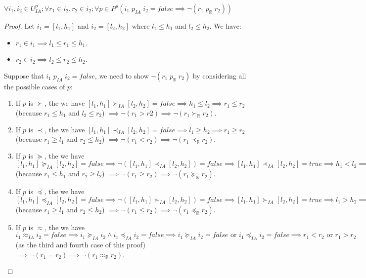 \begin{lemma} \label{lemma:IA-R-OP}
$\forall i_1, i_2 \in U^p_{IA}; \forall r_1 \in i_2, r_2 \in i_2; \forall p \in P^p (i_1 \; p_{IA} \; i_2 = false \implies \neg(r_1 \; p_\mathbb{R} \; r_2))$
\end{lemma}

\begin{proof}
Let $i_1 = [l_1, h_1]$ and $i_2 = [l_2, h_2]$ where $l_1 \le h_1$ and $l_2 \le h_2$. We have: 
\begin{itemize}
\item $r_1 \in i_1 \implies l_1 \le r_1 \le h_1$. 
\item $r_2 \in i_2 \implies l_2 \le r_2 \le h_2$. 
\end{itemize}
Suppose  that $i_1 \; p_{IA} \; i_2 = false$, we need to show $\neg(r_1 \; p_\mathbb{R} \; r_2)$ by considering all the possible cases of $p$:
\begin{enumerate}
\item If $p$ is $\succ$, the we have $[l_1, h_1] \succ_{IA} [l_2, h_2] = false \implies h_1 \le l_2 \implies r_1 \le r_2$ (because $r_1 \le h_1$ and $l_2 \le r_2$) $\implies \neg(r_1 > r2) \implies \neg(r_1 \succ_\mathbb{R} r_2)$.
\item If $p$ is $\prec$, the we have $[l_1, h_1] \prec_{IA} [l_2, h_2] = false \implies l_1 \ge h_2 \implies r_1 \ge r_2$ (because $r_1 \ge l_1$ and $r_2 \le h_2$) $\implies \neg(r_1 < r_2) \implies \neg(r_1 \prec_\mathbb{R} r_2)$.
\item If $p$ is $\succeq$, the we have $[l_1, h_1] \succeq_{IA} [l_2, h_2] = false \implies \neg ([l_1, h_1] \prec_{IA} [l_2, h_2]) = false \implies [l_1, h_1] \prec_{IA} [l_2, h_2] = true \implies h_1 < l_2 \implies r_1 < r_2$ (because $r_1 \le h_1$ and $r_2 \ge l_2$) $\implies \neg(r_1 \ge r_2) \implies \neg(r_1 \succeq_\mathbb{R} r_2)$.
\item If $p$ is $\preceq$, the we have $[l_1, h_1] \preceq_{IA} [l_2, h_2] = false \implies \neg ([l_1, h_1] \succ_{IA} [l_2, h_2]) = false \implies [l_1, h_1] \succ_{IA} [l_2, h_2] = true \implies l_1 > h	_2 \implies r_1 > r_2$ (because $r_1 \ge l_1$ and $r_2 \le h_2$) $\implies \neg(r_1 \le r_2) \implies \neg(r_1 \preceq_\mathbb{R} r_2)$.
\item If $p$ is $\approx$, the we have $i_1 \approx_{IA} i_2 = false \implies i_1 \succeq_{IA} i_2 \wedge i_1 \preceq_{IA} i_2 = false \implies i_1 \succeq_{IA} i_2 = false \text{ or } i_1 \preceq_{IA} i_2 = false \implies r_1 < r_2 \text{ or } r_1 > r_2$ (as the third and fourth case of this proof) $\implies \neg(r_1 = r_2) \implies \neg(r_1 \approx_\mathbb{R} r_2)$.

\end{enumerate}
\end{proof}
